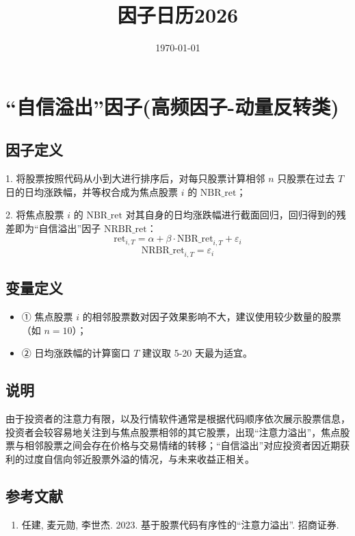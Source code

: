 \documentclass{article}
\title{因子日历2026}
\date{\today}
\begin{document}
\maketitle

\section{“自信溢出”因子(高频因子-动量反转类)}

\subsection{因子定义}

1. 将股票按照代码从小到大进行排序后，对每只股票计算相邻 \( n \) 只股票在过去 \( T \) 日的日均涨跌幅，并等权合成为焦点股票 \( i \) 的 \( \mathrm{NBR\_ret} \)；

2. 将焦点股票 \( i \) 的 \( \mathrm{NBR\_ret} \) 对其自身的日均涨跌幅进行截面回归，回归得到的残差即为“自信溢出”因子 \( \mathrm{NRBR\_ret} \)：
\begin{equation}
    \mathrm{ret}_{i,T} = \alpha + \beta \cdot \mathrm{NBR\_ret}_{i,T} + \varepsilon_i
\end{equation}
\begin{equation}
    \mathrm{NRBR\_ret}_{i,T} = \varepsilon_i
\end{equation}

\subsection{变量定义}
\begin{itemize}
    \item ① 焦点股票 \( i \) 的相邻股票数对因子效果影响不大，建议使用较少数量的股票（如 \( n=10 \)）；
    \item ② 日均涨跌幅的计算窗口 \( T \) 建议取 5-20 天最为适宜。
\end{itemize}

\subsection{说明}
由于投资者的注意力有限，以及行情软件通常是根据代码顺序依次展示股票信息，投资者会较容易地关注到与焦点股票相邻的其它股票，出现“注意力溢出”，焦点股票与相邻股票之间会存在价格与交易情绪的转移；“自信溢出”对应投资者因近期获利的过度自信向邻近股票外溢的情况，与未来收益正相关。

\subsection{参考文献}
\begin{enumerate}
    \item 任建, 麦元勋, 李世杰. 2023. 基于股票代码有序性的“注意力溢出”. 招商证券.
\end{enumerate}
\end{document}
